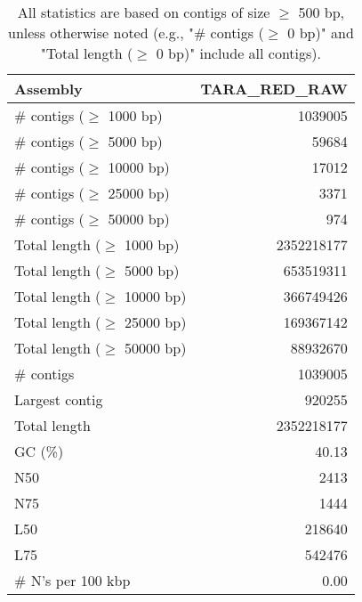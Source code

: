 \documentclass[12pt,a4paper]{article}
\begin{document}
\begin{table}[ht]
\begin{center}
\caption{All statistics are based on contigs of size $\geq$ 500 bp, unless otherwise noted (e.g., "\# contigs ($\geq$ 0 bp)" and "Total length ($\geq$ 0 bp)" include all contigs).}
\begin{tabular}{|l*{1}{|r}|}
\hline
Assembly & TARA\_RED\_RAW \\ \hline
\# contigs ($\geq$ 1000 bp) & 1039005 \\ \hline
\# contigs ($\geq$ 5000 bp) & 59684 \\ \hline
\# contigs ($\geq$ 10000 bp) & 17012 \\ \hline
\# contigs ($\geq$ 25000 bp) & 3371 \\ \hline
\# contigs ($\geq$ 50000 bp) & 974 \\ \hline
Total length ($\geq$ 1000 bp) & 2352218177 \\ \hline
Total length ($\geq$ 5000 bp) & 653519311 \\ \hline
Total length ($\geq$ 10000 bp) & 366749426 \\ \hline
Total length ($\geq$ 25000 bp) & 169367142 \\ \hline
Total length ($\geq$ 50000 bp) & 88932670 \\ \hline
\# contigs & 1039005 \\ \hline
Largest contig & 920255 \\ \hline
Total length & 2352218177 \\ \hline
GC (\%) & 40.13 \\ \hline
N50 & 2413 \\ \hline
N75 & 1444 \\ \hline
L50 & 218640 \\ \hline
L75 & 542476 \\ \hline
\# N's per 100 kbp & 0.00 \\ \hline
\end{tabular}
\end{center}
\end{table}
\end{document}

